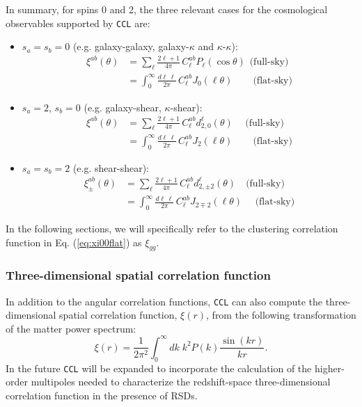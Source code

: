 \documentclass[\docopts]{\docclass}
\newcommand{\ccl}{{\tt CCL}\xspace}
\begin{document}
In summary, for spins 0 and 2, the three relevant cases for the cosmological observables supported by \ccl are:
\begin{itemize}
  \item $s_a=s_b=0$ (e.g. galaxy-galaxy, galaxy-$\kappa$ and $\kappa$-$\kappa$):
    \begin{align}\label{eq:xi00full}
      \xi^{ab}(\theta)&=\sum_\ell\frac{2\ell+1}{4\pi}\,C^{ab}_\ell P_\ell(\cos\theta)\hspace{5pt}\text{(full-sky)}\\\label{eq:xi00flat}
                      &=\int_0^\infty\frac{d\ell\,\ell}{2\pi}\,C^{ab}_\ell J_0(\ell\theta)\hspace{25pt}\text{(flat-sky)}
    \end{align}
  \item $s_a=2$, $s_b=0$ (e.g. galaxy-shear, $\kappa$-shear):
    \begin{align}\label{eq:xi02full}
      \xi^{ab}(\theta)&=\sum_\ell\frac{2\ell+1}{4\pi}\,C^{ab}_\ell d^\ell_{2,0}(\theta)\hspace{15pt}\text{(full-sky)}\\\label{eq:xi02flat}
                      &=\int_0^\infty\frac{d\ell\,\ell}{2\pi}\,C^{ab}_\ell J_2(\ell\theta)\hspace{25pt}\text{(flat-sky)}
    \end{align}
  \item $s_a=s_b=2$ (e.g. shear-shear):
    \begin{align}\label{eq:xi22full}
      \xi^{ab}_\pm(\theta)&=\sum_\ell\frac{2\ell+1}{4\pi}\,C^{ab}_\ell d^\ell_{2,\pm2}(\theta)\hspace{12pt}\text{(full-sky)}\\\label{eq:xi22flat}
                      &=\int_0^\infty\frac{d\ell\,\ell}{2\pi}\,C^{ab}_\ell J_{2\mp2}(\ell\theta)\hspace{16pt}\text{(flat-sky)}
    \end{align}
\end{itemize}
In the following sections, we will specifically refer to the clustering correlation function in Eq. (\ref{eq:xi00flat}) as $\xi_{gg}$.

\subsubsection{Three-dimensional spatial correlation function}
In addition to the angular correlation functions, \ccl can also compute the three-dimensional spatial correlation function, $\xi(r)$, from the following transformation of the matter power spectrum:
\begin{equation}
\xi(r) = \frac{1}{2 \pi^2} \int_0^\infty dk \; k^2 P(k) \frac{\sin(kr)}{kr}.
\label{eq:xi3d}
\end{equation}
In the future \ccl will be expanded to incorporate the calculation of the higher-order multipoles needed to characterize the redshift-space three-dimensional correlation function in the presence of RSDs.
\end{document}
